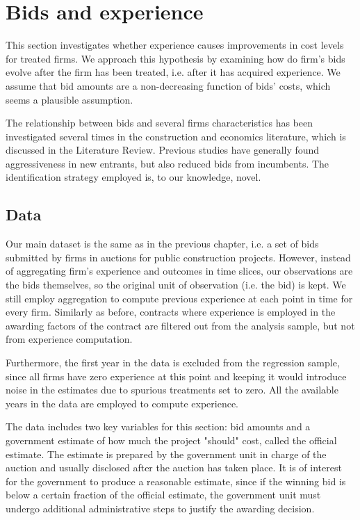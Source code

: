\section{Bids and experience}
\label{section:bidsexp}
This section investigates whether experience causes improvements in cost levels for treated firms. We approach this hypothesis by examining how do firm's bids evolve after the firm has been treated, i.e. after it has acquired experience. We assume that bid amounts are a non-decreasing function of bids' costs, which seems a plausible assumption.

The relationship between bids and several firms characteristics has been investigated several times in the construction and economics literature, which is discussed in the Literature Review. Previous studies have generally found aggressiveness in new entrants, but also reduced bids from incumbents. The identification strategy employed is, to our knowledge, novel.


\subsection{Data}
Our main dataset is the same as in the previous chapter, i.e. a set of bids submitted by firms in auctions for public construction projects. However, instead of aggregating firm's experience and outcomes in time slices, our observations are the bids themselves, so the original unit of observation (i.e. the bid) is kept. We still employ aggregation to compute previous experience at each point in time for every firm. Similarly as before, contracts where experience is employed in the awarding factors of the contract are filtered out from the analysis sample, but not from experience computation.

Furthermore, the first year in the data is excluded from the regression sample, since all firms have zero experience at this point and keeping it would introduce noise in the estimates due to spurious treatments set to zero. All the available years in the data are employed to compute experience.

The data includes two key variables for this section: bid amounts and a government estimate of how much the project "should" cost, called the official estimate. The estimate is prepared by the government unit in charge of the auction and usually disclosed after the auction has taken place. It is of interest for the government to produce a reasonable estimate, since if the winning bid is below a certain fraction of the official estimate, the government unit must undergo additional administrative steps to justify the awarding decision.

